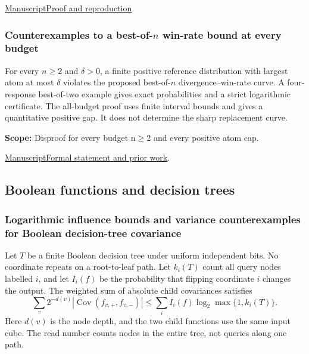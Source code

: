 \documentclass[11pt,a4paper]{article}
\begin{document}
\href{https://github.com/dvgyl/math-and-theory/blob/main/papers/theoretical-computer-science/critical-hardcore/manuscript.pdf}{Manuscript}\quad\href{https://github.com/dvgyl/math-and-theory/blob/main/papers/theoretical-computer-science/critical-hardcore/README.md}{Proof and reproduction}.

\subsubsection{Counterexamples to a best-of-\texorpdfstring{$n$}{n} win-rate bound at every budget}

For every $n\geq2$ and $\delta>0$, a finite positive reference distribution with largest atom at most $\delta$ violates the proposed best-of-$n$ divergence--win-rate curve. A four-response best-of-two example gives exact probabilities and a strict logarithmic certificate. The all-budget proof uses finite interval bounds and gives a quantitative positive gap. It does not determine the sharp replacement curve.

\par\smallskip

\noindent\textbf{Scope:} Disproof for every budget n$\geq$2 and every positive atom cap.

\par\smallskip

\noindent\href{https://github.com/dvgyl/math-and-theory/blob/main/papers/theoretical-computer-science/best-of-n/paper.pdf}{Manuscript}\quad\href{https://github.com/dvgyl/math-and-theory/blob/main/lean/docs/theoretical-computer-science/best-of-n.md}{Formal statement and prior work}.

\subsection{Boolean functions and decision trees}

\subsubsection{Logarithmic influence bounds and variance counterexamples for Boolean decision-tree covariance}

Let $T$ be a finite Boolean decision tree under uniform independent bits. No coordinate repeats on a root-to-leaf path. Let $k_i(T)$ count all query nodes labelled $i$, and let $I_i(f)$ be the probability that flipping coordinate $i$ changes the output. The weighted sum of absolute child covariances satisfies
\[
\sum_v 2^{-d(v)}\left|\operatorname{Cov}(f_{v,+},f_{v,-})\right|
\leq \sum_i I_i(f)\log_2\max\{1,k_i(T)\}.
\]
Here $d(v)$ is the node depth, and the two child functions use the same input cube. The read number counts nodes in the entire tree, not queries along one path.
\end{document}
